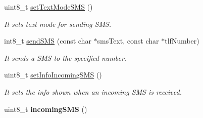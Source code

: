 \begin{DoxyCompactItemize}
uint8\+\_\+t \hyperlink{class_wasp_g_p_r_s___pro__core_aa30b4e29d564cec8d2c7357b85b5d0a1}{set\+Text\+Mode\+S\+MS} ()
\begin{DoxyCompactList}\small\item\em It sets \textquotesingle{}text mode\textquotesingle{} for sending S\+MS. \end{DoxyCompactList}\item 
int8\+\_\+t \hyperlink{class_wasp_g_p_r_s___pro__core_a6bf4719cbfeb2e8c4cc59fc721e9c87b}{send\+S\+MS} (const char $\ast$sms\+Text, const char $\ast$tlf\+Number)
\begin{DoxyCompactList}\small\item\em It sends a S\+MS to the specified number. \end{DoxyCompactList}\item 
uint8\+\_\+t \hyperlink{class_wasp_g_p_r_s___pro__core_a2a405547e7ebf394ec809920f2b77b2d}{set\+Info\+Incoming\+S\+MS} ()
\begin{DoxyCompactList}\small\item\em It sets the info shown when an incoming S\+MS is received. \end{DoxyCompactList}\item 
uint8\+\_\+t {\bfseries incoming\+S\+MS} ()\hypertarget{class_wasp_g_p_r_s___pro__core_a6f7d07a417f4be40bce8f125012b3556}{}\label{class_wasp_g_p_r_s___pro__core_a6f7d07a417f4be40bce8f125012b3556}


\end{DoxyCompactItemize}
